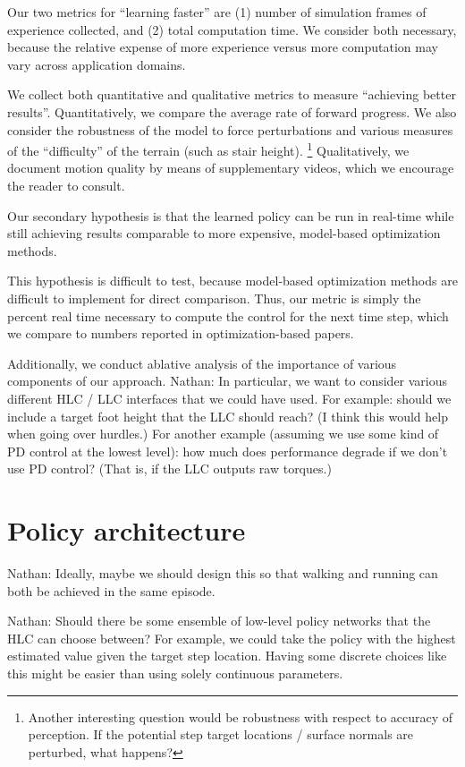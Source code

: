 \documentclass[a4paper]{article}
\newcommand{\nhatch}[1]{{\leavevmode\color{blue} Nathan: #1}}
\begin{document}
Our two metrics for ``learning faster'' are (1) number of simulation frames of experience collected, and (2) total computation time.
We consider both necessary, because the relative expense of more experience versus more computation may vary across application domains.

We collect both quantitative and qualitative metrics to measure ``achieving better results''.
Quantitatively, we compare the average rate of forward progress.
We also consider the robustness of the model to force perturbations and various measures of the ``difficulty'' of the terrain (such as stair height).
\footnote{Another interesting question would be robustness with respect to accuracy of perception.
If the potential step target locations / surface normals are perturbed, what happens?}
Qualitatively, we document motion quality by means of supplementary videos, which we encourage the reader to consult.

Our secondary hypothesis is that the learned policy can be run in real-time while still achieving results comparable to more expensive, model-based optimization methods.

This hypothesis is difficult to test, because model-based optimization methods are difficult to implement for direct comparison.
Thus, our metric is simply the percent real time necessary to compute the control for the next time step, which we compare to numbers reported in optimization-based papers.

Additionally, we conduct ablative analysis of the importance of various components of our approach.
\nhatch{In particular, we want to consider various different HLC / LLC interfaces that we could have used.
For example: should we include a target foot height that the LLC should reach?
(I think this would help when going over hurdles.)
For another example (assuming we use some kind of PD control at the lowest level): how much does performance degrade if we don't use PD control?
(That is, if the LLC outputs raw torques.)}

\section{Policy architecture}

\nhatch{Ideally, maybe we should design this so that walking and running can both be achieved in the same episode.}

\nhatch{Should there be some ensemble of low-level policy networks that the HLC can choose between?
For example, we could take the policy with the highest estimated value given the target step location.
Having some discrete choices like this might be easier than using solely continuous parameters.}
\end{document}
